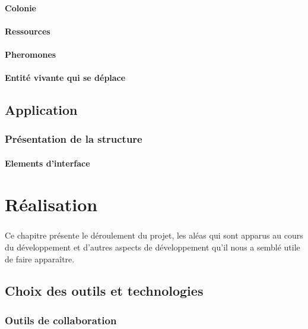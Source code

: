 \documentclass{EPUProjetDi}
\begin{document}
\subsubsection{Colonie}

\subsubsection{Ressources}

\subsubsection{Pheromones}

\subsubsection{Entité vivante qui se déplace}


\section{Application}

\subsection{Présentation de la structure}

\subsubsection{Elements d'interface}

\chapter{Réalisation}

\paragraph{}
Ce chapitre présente le déroulement du projet, les aléas qui sont apparus au cours du 
développement et d'autres aspects de développement qu'il nous a semblé 
utile de faire apparaître.

\section{Choix des outils et technologies}

\subsection{Outils de collaboration}
\end{document}

